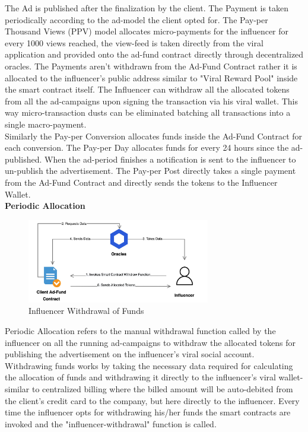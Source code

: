 \documentclass[conference]{IEEEtran}
\begin{document}
The Ad is published after the finalization by the client. The Payment is taken periodically according to the ad-model the client opted for. The Pay-per Thousand Views (PPV) model allocates micro-payments for the influencer for every 1000 views reached, the view-feed is taken directly from the viral application and provided onto the ad-fund contract directly through decentralized oracles. The Payments aren't withdrawn from the Ad-Fund Contract rather it is allocated to the influencer's public address similar to "Viral Reward Pool" inside the smart contract itself. The Influencer can withdraw all the allocated tokens from all the ad-campaigns upon signing the transaction via his viral wallet. This way micro-transaction dusts can be eliminated batching all transactions into a single macro-payment. \\

Similarly the Pay-per Conversion allocates funds inside the Ad-Fund Contract for each conversion. The Pay-per Day allocates funds for every 24 hours since the ad-published. When the ad-period finishes a notification is sent to the influencer to un-publish the advertisement. The Pay-per Post directly takes a single payment from the Ad-Fund Contract and directly sends the tokens to the Influencer Wallet.\\

\textbf{Periodic Allocation}\\

\begin{figure}[H]
\begin{center}
\includegraphics[width=8cm]{periodic-allocation}
\caption{Influencer Withdrawal of Funds}
\end{center}
\end{figure}

Periodic Allocation refers to the manual withdrawal function called by the influencer on all the running ad-campaigns to withdraw the allocated tokens for publishing the advertisement on the influencer's viral social account. Withdrawing funds works by taking the necessary data required for  calculating the allocation of funds and withdrawing it directly to the influencer's viral wallet- similar to centralized billing where the billed amount will be auto-debited from the client's credit card to the company, but here directly to the influencer. Every time the influencer opts for withdrawing his/her funds the smart contracts are invoked and the "influencer-withdrawal" function is called.\\
\end{document}
